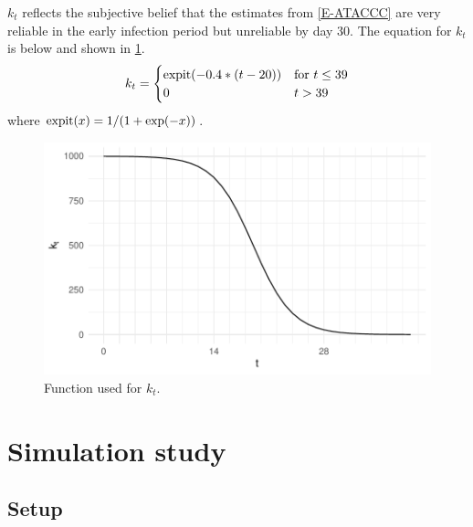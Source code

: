 \documentclass[thesis.tex]{subfiles}
\begin{document}
$k_t$ reflects the subjective belief that the estimates from \cref{E-ATACCC} are very reliable in the early infection period but unreliable by day 30.
The equation for $k_t$ is below and shown in \cref{perf-test:fig:kt}.
\begin{align}
k_t = \begin{cases}
  \operatorname{expit}(-0.4 * (t - 20)) &\text{for $t \leq 39$} \\
  0 &t > 39
\end{cases}
\end{align}
where $\operatorname{expit}(x) = 1 / (1 + \exp(-x))$.

\begin{figure}
  \centering \includegraphics{cis-perfect-testing/kt-prior}
  \caption{Function used for $k_t$. \label{perf-test:fig:kt}}
\end{figure}

\section{Simulation study} \label{perf-test:sec:simulation-study}

\subsection{Setup}
\end{document}
